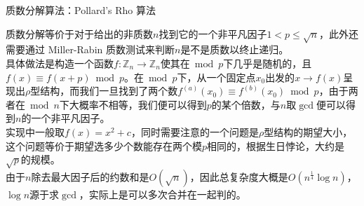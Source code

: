 \documentclass{beamer}
\begin{document}
\begin{frame}{质数分解算法：Pollard's Rho 算法}
	
	质数分解等价于对于给出的非质数$n$找到它的一个非平凡因子$1 < p \le \sqrt n$，此外还需要通过 Miller-Rabin 质数测试来判断$n$是不是质数以终止递归。\\
	
	具体做法是构造一个函数$f: \mathbb Z_n \to \mathbb Z_n$使其在$\bmod p$下几乎是随机的，且$f(x) \equiv f(x + p) \bmod p$。在$\bmod p$下，从一个固定点$x_0$出发的$x \to f(x)$呈现出$\rho$型结构，而我们一旦找到了两个数$f^{(a)}(x_0) \equiv f^{(b)}(x_0) \bmod p$，由于两者在$\bmod n$下大概率不相等，我们便可以得到$p$的某个倍数，与$n$取$\gcd$便可以得到$n$的一个非平凡因子。\\
	
	实现中一般取$f(x) = x^2 + c$，同时需要注意的一个问题是$\rho$型结构的期望大小，这个问题等价于期望选多少个数能存在两个模$p$相同的，根据生日悖论，大约是$\sqrt p$的规模。\\
	
	由于$n$除去最大因子后的约数和是$O(\sqrt n)$，因此总复杂度大概是$O(n^{\frac14}\log n)$，$\log n$源于求$\gcd$，实际上是可以多次合并在一起判的。
	
\end{frame}
\end{document}
